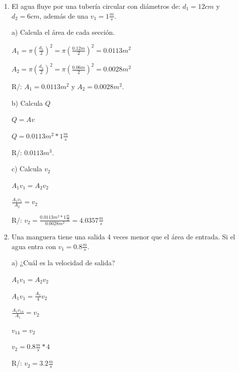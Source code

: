 \documentclass[a4paper, 11pt]{article}
\newcommand{\Pspace}{0.5cm}
\newcommand{\Aspace}{0.2cm}
\begin{document}
\begin{enumerate}
        \newpage
        \vspace{\Pspace}
    \item El agua fluye por una tubería circular con diámetros de: $d_1 = 12cm$ y $d_2 = 6cm$, además de una $v_1 = 1\frac{m}{s}$. \par
            \vspace{\Aspace} \par
            a) Calcula el área de cada sección.
            \\ { \color{azul} 
                $A_1 = \pi (\frac{d_1}{2})^2 = \pi (\frac{0.12m}{2})^2 = 0.0113m^2$
                \par $A_2 = \pi (\frac{d_2}{2})^2 = \pi (\frac{0.06m}{2})^2 = 0.0028m^2$
                \par R/: $A_1 = 0.0113m^2$ y $A_2 = 0.0028m^2$.
            }

            \vspace{\Aspace} \par
            b) Calcula $Q$
            \\ { \color{azul} 
                $Q = Av$
                \par $Q = 0.0113m^2 * 1 \frac{m}{s}$
                \par R/: $0.0113m^3$.
            }

            \vspace{\Aspace} \par
            c) Calcula $v_2$
            \\ { \color{azul} 
                $A_1v_1 = A_2v_2$
                \par $\frac{A_1v_1}{A_2} = v_2$
                \par R/: $v_2 = \frac{0.0113m^2 * 1 \frac{m}{2}}{0.0028m^2} = 4.0357 \frac{m}{s}$
            }



        \vspace{\Pspace}
        \item Una manguera tiene una salida 4 veces menor que el área de entrada. Si el agua entra con $v_1 = 0.8 \frac{m}{s}$. \par
            \vspace{\Aspace} \par
            a) ¿Cuál es la velocidad de salida?
            \\ { \color{azul} 
                $A_1v_1 = A_2v_2$
                \par $A_1v_1 = \frac{A_1}{4}v_2$
                \par $\frac{A_1v_14}{A_1} = v_2$
                \par $v_14 = v_2$
                \par $v_2 = 0.8 \frac{m}{s} * 4$
                \par R/: $v_2 = 3.2 \frac{m}{s}$
            }


\end{enumerate}
\end{document}
